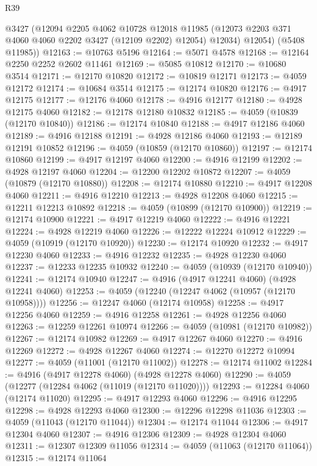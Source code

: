 \begin{lexlean}{R39}
\begin{coremodule}
        @3427
        (@12094
          @2205
          @4062
          @10728
          @12018
          @11985
          (@12073 @2203 @371 @4060 @4060 @2202 @3427 (@12109 @2202) @12054)
          @12034)
        @12054)
      (@5408 @11985))
@12163 := @10763 @5196
@12164 := @5071 @4578
@12168 := @12164 @2250 @2252 @2602 @11461
@12169 := @5085 @10812
@12170 := @10680 @3514
@12171 := @12170 @10820
@12172 := @10819 @12171
@12173 := @4059 @12172
@12174 := @10684 @3514
@12175 := @12174 @10820
@12176 := @4917 @12175
@12177 := @12176 @4060
@12178 := @4916 @12177
@12180 := @4928 @12175 @4060
@12182 := @12178 @12180 @10832
@12185 := @4059 (@10839 (@12170 @10840))
@12186 := @12174 @10840
@12188 := @4917 @12186 @4060
@12189 := @4916 @12188
@12191 := @4928 @12186 @4060
@12193 := @12189 @12191 @10852
@12196 := @4059 (@10859 (@12170 @10860))
@12197 := @12174 @10860
@12199 := @4917 @12197 @4060
@12200 := @4916 @12199
@12202 := @4928 @12197 @4060
@12204 := @12200 @12202 @10872
@12207 := @4059 (@10879 (@12170 @10880))
@12208 := @12174 @10880
@12210 := @4917 @12208 @4060
@12211 := @4916 @12210
@12213 := @4928 @12208 @4060
@12215 := @12211 @12213 @10892
@12218 := @4059 (@10899 (@12170 @10900))
@12219 := @12174 @10900
@12221 := @4917 @12219 @4060
@12222 := @4916 @12221
@12224 := @4928 @12219 @4060
@12226 := @12222 @12224 @10912
@12229 := @4059 (@10919 (@12170 @10920))
@12230 := @12174 @10920
@12232 := @4917 @12230 @4060
@12233 := @4916 @12232
@12235 := @4928 @12230 @4060
@12237 := @12233 @12235 @10932
@12240 := @4059 (@10939 (@12170 @10940))
@12241 := @12174 @10940
@12247 := @4916 (@4917 @12241 @4060) (@4928 @12241 @4060)
@12253 := @4059 (@12240 (@12247 @4062 (@10957 (@12170 @10958))))
@12256 := @12247 @4060 (@12174 @10958)
@12258 := @4917 @12256 @4060
@12259 := @4916 @12258
@12261 := @4928 @12256 @4060
@12263 := @12259 @12261 @10974
@12266 := @4059 (@10981 (@12170 @10982))
@12267 := @12174 @10982
@12269 := @4917 @12267 @4060
@12270 := @4916 @12269
@12272 := @4928 @12267 @4060
@12274 := @12270 @12272 @10994
@12277 := @4059 (@11001 (@12170 @11002))
@12278 := @12174 @11002
@12284 := @4916 (@4917 @12278 @4060) (@4928 @12278 @4060)
@12290 := @4059 (@12277 (@12284 @4062 (@11019 (@12170 @11020))))
@12293 := @12284 @4060 (@12174 @11020)
@12295 := @4917 @12293 @4060
@12296 := @4916 @12295
@12298 := @4928 @12293 @4060
@12300 := @12296 @12298 @11036
@12303 := @4059 (@11043 (@12170 @11044))
@12304 := @12174 @11044
@12306 := @4917 @12304 @4060
@12307 := @4916 @12306
@12309 := @4928 @12304 @4060
@12311 := @12307 @12309 @11056
@12314 := @4059 (@11063 (@12170 @11064))
@12315 := @12174 @11064

\end{coremodule}
\end{lexlean}
